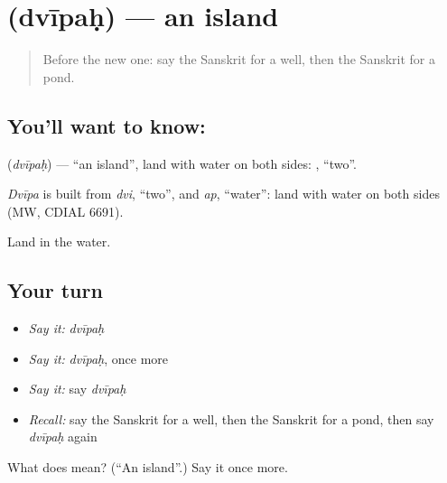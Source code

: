 \section[\texorpdfstring{\sk{द्वीपः} (dvīpaḥ)}{द्वीपः (dvīpaḥ)}]{ (dvīpaḥ) — an island}

\label{lesson:SA-C82-island}



\begin{quote}
Before the new one: say the Sanskrit for a well, then the Sanskrit for a pond.
\end{quote}

\subsection*{You'll want to know: }
\textbf{} (\emph{dvīpaḥ}) — \textquotedblleft{}an island\textquotedblright{}, land with water on both sides: \textbf{}, \textquotedblleft{}two\textquotedblright{}.

\begin{cousinweb}
\emph{Dvīpa} is built from \emph{dvi}, \textquotedblleft{}two\textquotedblright{}, and \emph{ap}, \textquotedblleft{}water\textquotedblright{}: land with water on both sides (MW, CDIAL 6691).
\end{cousinweb}

\begin{grammarlens}[title={What you've built}]
Land in the water.
\end{grammarlens}

\subsection*{Your turn}
\begin{itemize}
\raggedright
  \item \emph{Say it:} \emph{dvīpaḥ}
  \item \emph{Say it:} \emph{dvīpaḥ}, once more
  \item \emph{Say it:} say \emph{dvīpaḥ}
  \item \emph{Recall:} say the Sanskrit for a well, then the Sanskrit for a pond, then say \emph{dvīpaḥ} again
\end{itemize}

\begin{tcolorbox}[breakable,colback=teal!4,colframe=teal!35!black,title={Before you move on}]
What does  mean? (\textquotedblleft{}An island\textquotedblright{}.) Say it once more.
\end{tcolorbox}
